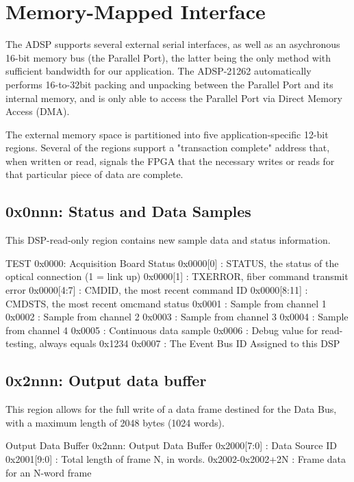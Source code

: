 
\section{Memory-Mapped Interface}

 The ADSP supports several external serial interfaces, as well
as an asychronous 16-bit memory bus (the Parallel Port), the latter
being the only method with sufficient bandwidth for our application.
The ADSP-21262 automatically performs 16-to-32bit packing and
unpacking between the Parallel Port and its internal memory, and is
only able to access the Parallel Port via Direct Memory Access (DMA).


 The external memory space is partitioned into five
application-specific 12-bit regions. Several of the regions support a
"transaction complete" address that, when written or read, signals the
FPGA that the necessary writes or reads for that particular piece of
data are complete.  

\subsection{0x0nnn: Status and  Data  Samples}
This DSP-read-only region contains new sample data and status
information.

\begin{memmap}{TEST}
0x0000: Acquisition Board Status
0x0000[0] : STATUS, the status of the optical connection (1 = link up)
0x0000[1] : TXERROR, fiber command transmit error
0x0000[4:7] : CMDID, the most recent command ID
0x0000[8:11] : CMDSTS, the most recent omcmand status
0x0001 : Sample from channel 1
0x0002 : Sample from channel 2
0x0003 : Sample from channel 3
0x0004 : Sample from channel 4
0x0005 :  Continuous data sample
0x0006 : Debug value for read-testing, always equals 0x1234
0x0007 : The Event Bus ID Assigned to this DSP
\end{memmap}


\subsection{0x2nnn: Output data buffer} 
 This region allows for the full write of a data frame destined
for the Data Bus, with a maximum length of 2048 bytes (1024
words).

\begin{memmap}{Output Data Buffer}
0x2nnn: Output Data Buffer
0x2000[7:0] : Data Source ID
0x2001[9:0] : Total length of frame N, in words. 
0x2002-0x2002+2N : Frame data for an N-word frame
\end{memmap}


